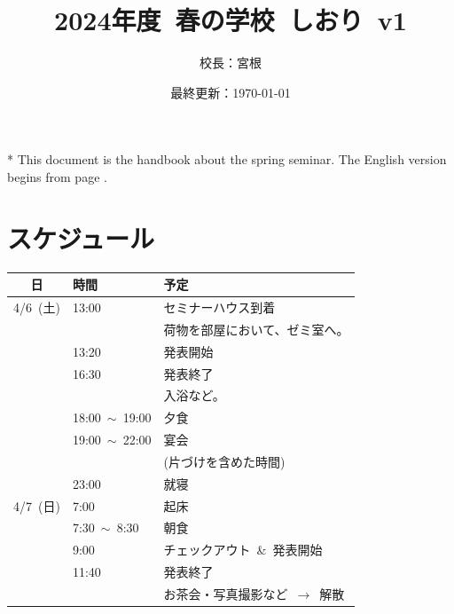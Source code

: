 \documentclass[unicode,a4paper,11pt]{ltjsarticle}
\title{
    2024年度\ 春の学校\ しおり\ v1
}
\author{
  校長：宮根
}
\date{最終更新：\today}
\begin{document}
\maketitle

* This document is the handbook about the spring seminar. The English version begins from page \pageref{eng_page}.

\tableofcontents



\clearpage

\section{スケジュール}

\begin{center}
  \begin{tabular}{cll}\hline
    日        & 時間                 & 予定                                      \\ \hline
    4/6\ (土) & 13:00                & セミナーハウス到着                        \\
              &                      & 荷物を部屋において、ゼミ室へ。            \\
              & 13:20                & 発表開始                                  \\
              & 16:30                & 発表終了                                  \\
              &                      & 入浴など。                                \\
              & 18:00\ $\sim$\ 19:00 & 夕食                                      \\
              & 19:00\ $\sim$\ 22:00 & 宴会                                      \\
              &                      & (片づけを含めた時間)                      \\
              & 23:00                & 就寝                                      \\ \hline
    4/7\ (日) & 7:00                 & 起床                                      \\
              & 7:30\ $\sim$\  8:30  & 朝食                                      \\
              & 9:00                 & チェックアウト\ \&\ 発表開始              \\
              & 11:40                & 発表終了                                  \\
              &                      & お茶会・写真撮影など\ $\rightarrow$\ 解散 \\ \hline
  \end{tabular}
\end{center}
\end{document}
